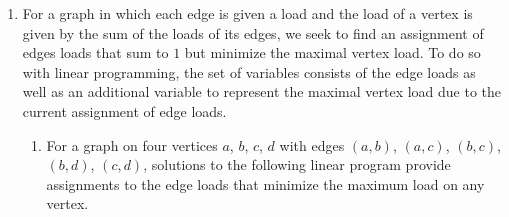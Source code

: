 \documentclass[letterpaper,11pt]{article}
\begin{document}
\begin{enumerate}
\begin{proof}
            Second, all points on the line between $x$ and $x^\prime$ are identified by
            $\alpha \in [0,1]$ as follows.
            $$
            \alpha x + (1-\alpha)x^\prime
            $$

            Third, we examine some resulting inequalities.
            \begin{align}
                (1 - \alpha)x^\prime \cdot a & \leq (1 - \alpha) b \label{ineq:oneminusalphax} \\
                \alpha x \cdot a \leq \alpha b \label{ineq:alphax}
            \end{align}

            Finally, we consider the following equality, which is a
            reformulation of what it means to lie on the line between $x$ and
            $x^\prime$.
            \begin{align}
                (\alpha x \cdot a + (1 - \alpha) x^\prime) \cdot a
                &= \alpha x \cdot a + (1 - \alpha) \cdot a \notag \\
                &= \alpha x \cdot a + x^\prime \cdot a - \alpha x^\prime \cdot a \label{eq:qed}
            \end{align}

            Adding up inequalities \eqref{ineq:oneminusalphax} and
            \eqref{ineq:alphax}, we arrive at the statement we wish to prove,
            which completes the proof.

            Alternatively, suppose that a point on the line between $x$ and
            $x^\prime$ were not a feasible solution. Geometrically, that would
            be a contradiction of the convexity of the feasible region. Hence,
            all points on a line between any two feasible solutions must be
            feasible solutions.
        \end{proof}

    \item For a graph in which each edge is given a load and the load of a
        vertex is given by the sum of the loads of its edges, we seek to find
        an assignment of edges loads that sum to $1$ but minimize the maximal
        vertex load. To do so with linear programming, the set of variables
        consists of the edge loads as well as an additional variable to
        represent the maximal vertex load due to the current assignment of edge
        loads.

        \begin{enumerate}
            \item For a graph on four vertices $a$, $b$, $c$, $d$ with edges
                $(a, b)$, $(a, c)$, $(b, c)$, $(b, d)$, $(c, d)$, solutions
                to the following linear program provide assignments to the
                edge loads that minimize the maximum load on any vertex.


\end{enumerate}
\end{enumerate}
\end{document}
